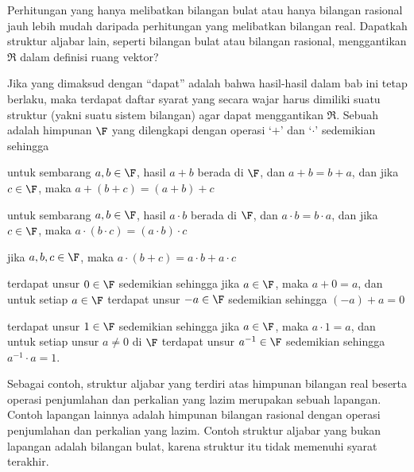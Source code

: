 Perhitungan yang hanya melibatkan bilangan bulat atau hanya bilangan rasional
jauh lebih mudah daripada perhitungan yang melibatkan bilangan real.
Dapatkah struktur aljabar lain, seperti bilangan bulat atau bilangan rasional,
menggantikan
\( \Re \) dalam definisi ruang vektor?

Jika yang dimaksud dengan ``dapat'' adalah bahwa hasil-hasil dalam bab ini
tetap berlaku,
maka terdapat daftar syarat yang secara wajar harus dimiliki suatu struktur
(yakni suatu sistem bilangan)
agar dapat menggantikan $\Re$.
Sebuah  adalah himpunan
\( \F \) yang dilengkapi dengan operasi
`\( + \)'
dan `\( \cdot \)' sedemikian sehingga
\begin{tfae}
   \item untuk sembarang \( a,b\in\F \), hasil \( a+b \) berada di \( \F \), dan
         \( a+b=b+a \), dan
         jika \( c\in\F \), maka \( a+(b+c)=(a+b)+c \)
   \item untuk sembarang \( a,b\in\F \), hasil \( a\cdot b \) berada di \( \F \), dan
         \( a\cdot b=b\cdot a \), dan
         jika \( c\in\F \), maka \( a\cdot (b\cdot c)=(a\cdot b)\cdot c \)
   \item jika \( a,b,c\in\F \), maka \( a\cdot (b+c)=a\cdot b+a\cdot c \)
   \item terdapat unsur \( 0\in\F \) sedemikian sehingga
         jika \( a\in\F \), maka \( a+0=a \), dan
         untuk setiap \( a\in\F \) terdapat unsur \( -a\in\F \)
                sedemikian sehingga \( (-a)+a=0 \)
   \item terdapat unsur \( 1\in\F \) sedemikian sehingga
         jika \( a\in\F \), maka \( a\cdot 1=a \), dan
         untuk setiap unsur \( a\neq 0 \) di \( \F \)
                terdapat unsur \( a^{-1}\in\F \)
                sedemikian sehingga \( a^{-1}\cdot a=1 \).
\end{tfae}

Sebagai contoh, struktur aljabar yang terdiri atas himpunan bilangan real
beserta operasi penjumlahan dan perkalian yang lazim merupakan sebuah lapangan.
Contoh lapangan lainnya adalah himpunan bilangan rasional dengan operasi
penjumlahan dan perkalian yang lazim.
Contoh struktur aljabar yang bukan lapangan adalah
bilangan bulat, karena struktur itu tidak memenuhi syarat terakhir.

